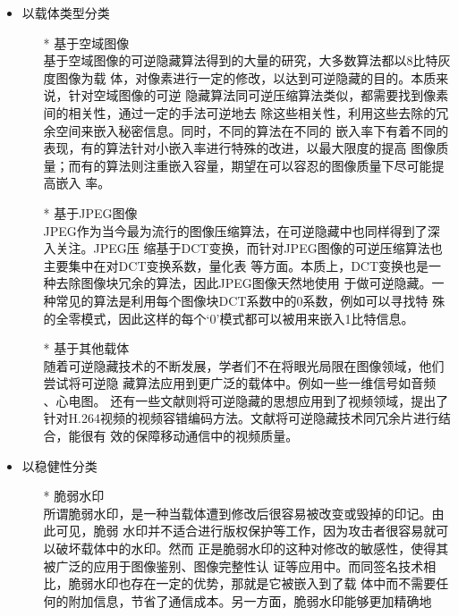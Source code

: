 \begin{itemize}
\item 以载体类型分类\\
  \begin{itemize}
  \item[*] 基于空域图像\\
  基于空域图像的可逆隐藏算法得到的大量的研究，大多数算法都以8比特灰度图像为载
  体，对像素进行一定的修改，以达到可逆隐藏的目的。本质来说，针对空域图像的可逆
  隐藏算法同可逆压缩算法类似，都需要找到像素间的相关性，通过一定的手法可逆地去
  除这些相关性，利用这些去除的冗余空间来嵌入秘密信息。同时，不同的算法在不同的
  嵌入率下有着不同的表现，有的算法针对小嵌入率进行特殊的改进，以最大限度的提高
  图像质量；而有的算法则注重嵌入容量，期望在可以容忍的图像质量下尽可能提高嵌入
  率。\par
  \item[*] 基于JPEG图像\\
  JPEG作为当今最为流行的图像压缩算法，在可逆隐藏中也同样得到了深入关注。JPEG压
  缩基于DCT变换，而针对JPEG图像的可逆压缩算法也主要集中在对DCT变换系数，量化表
  等方面。本质上，DCT变换也是一种去除图像块冗余的算法，因此JPEG图像天然地使用
  于做可逆隐藏。一种常见的算法是利用每个图像块DCT系数中的0系数，例如可以寻找特
  殊的全零模式，因此这样的每个‘0’模式都可以被用来嵌入1比特信息。\par
  \item[*] 基于其他载体\\
  随着可逆隐藏技术的不断发展，学者们不在将眼光局限在图像领域，他们尝试将可逆隐
  藏算法应用到更广泛的载体中。例如一些一维信号如音频\cite{shiu2014reversible}
  \cite{chen2013reversible}、心电图\cite{ibaida2013wavelet}\cite{rubio2013secure}。
  还有一些文献则将可逆隐藏的思想应用到了视频领域\cite{xu2014improved}，提出了
  针对H.264视频的视频容错编码方法。文献将可逆隐藏技术同冗余片进行结合，能很有
  效的保障移动通信中的视频质量。
  \par
  \end{itemize}
\item 以稳健性分类\\
  \begin{itemize}
  \item[*] 脆弱水印\\
  所谓脆弱水印，是一种当载体遭到修改后很容易被改变或毁掉的印记。由此可见，脆弱
  水印并不适合进行版权保护等工作，因为攻击者很容易就可以破坏载体中的水印。然而
  正是脆弱水印的这种对修改的敏感性，使得其被广泛的应用于图像鉴别、图像完整性认
  证等应用中。而同签名技术相比，脆弱水印也存在一定的优势，那就是它被嵌入到了载
  体中而不需要任何的附加信息，节省了通信成本。另一方面，脆弱水印能够更加精确地

\end{itemize}
\end{itemize}
